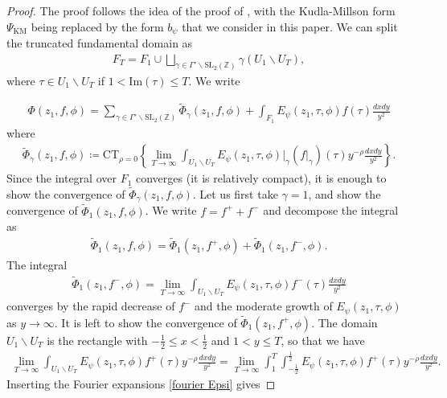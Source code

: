 \documentclass[twoside,a4paper,10pt]{article} %
\newcommand{\dxdy}{\frac{dxdy}{y^2}}
\newcommand{\8}{\infty}
\newcommand{\Z}{\mathbb{Z}}
\newcommand{\SL}{\mathrm{SL}}
\newcommand{\KM}{\mathrm{KM}}
\newcommand{\CT}{\mathrm{CT}_{\rho=0}}
\newcommand{\intx}{\int_{-\frac{1}{2}}^{\frac{1}{2}}}
\newcommand{\im}{\mathrm{Im}}
\theoremstyle{mytheoremstyle}
\theoremstyle{remark}
\numberwithin{equation}{section}
\begin{document}
\begin{proof}
The proof follows the idea of the proof of \cite[Proposition.~5.6]{BF04}, with the Kudla-Millson form $\Psi_{\KM}$ being replaced by the form $b_\psi$ that we consider in this paper. We can split the truncated fundamental domain as
\begin{align}
F_T= F_1 \cup  \bigsqcup_{\gamma \in \Gamma' \backslash \SL_2(\Z)} \gamma \left (U_1 \smallsetminus U_T \right),
\end{align}
where $\tau \in U_1 \smallsetminus U_T$ if $1 < \im(\tau) \leq T$. We write

\begin{align}
\Phi(z_1,f,\phi)=\sum_{\gamma \in \Gamma' \backslash \SL_2(\Z)} \widetilde{\Phi}_\gamma(z_1,f,\phi)+\int_{F_1}E_{\psi}(z_1,\tau,\phi)f(\tau) \dxdy
\end{align}
where
\begin{align}
\widetilde{\Phi}_\gamma(z_1,f,\phi) \coloneqq \CT \left \{ \lim_{T\rightarrow \8} \int_{U_1 \smallsetminus U_T} E_{\psi}(z_1,\tau,\phi)\vert_{\gamma} (f \vert_\gamma)(\tau) y^{-\rho} \dxdy \right \}.
\end{align}
Since the integral over $F_1$ converges (it is relatively compact), it is enough to show the convergence of $\widetilde{\Phi}_\gamma(z_1,f,\phi)$. Let us first take $\gamma=1$, and show the convergence of $\widetilde{\Phi}_1(z_1,f,\phi)$. We write $f=f^++f^-$ and decompose the integral as
\begin{align}
\widetilde{\Phi}_1(z_1,f,\phi)=\widetilde{\Phi}_1(z_1,f^+,\phi)+\widetilde{\Phi}_1(z_1,f^-,\phi).
\end{align}The integral
\begin{align}
\widetilde{\Phi}_1(z_1,f^-,\phi)=\lim_{T\rightarrow \8} \int_{U_1 \smallsetminus U_T} E_{\psi}(z_1,\tau,\phi)f^-(\tau) \dxdy
\end{align}
converges by the rapid decrease of $f^-$ and the moderate growth of $E_{\psi}(z_1,\tau,\phi)$ as $y \rightarrow \8$. It is left to show the convergence of $\widetilde{\Phi}_1(z_1,f^+,\phi)$. The domain $U_1 \smallsetminus U_T$ is the rectangle with $-\frac{1}{2} \leq x < \frac{1}{2}$ and $1 <y \leq T$, so that we have
\begin{align}
\lim_{T \rightarrow \8} \int_{U_1 \smallsetminus U_T} E_{\psi}(z_1,\tau,\phi)f^+(\tau)y^{-\rho}\dxdy=\lim_{T \rightarrow \8}  \int_1^T \intx E_{\psi}(z_1,\tau,\phi)f^+(\tau)y^{-\rho} \frac{dxdy}{y^2}.
\end{align}
Inserting the Fourier expansions \eqref{fourier Epsi} gives

\end{proof}
\end{document}
